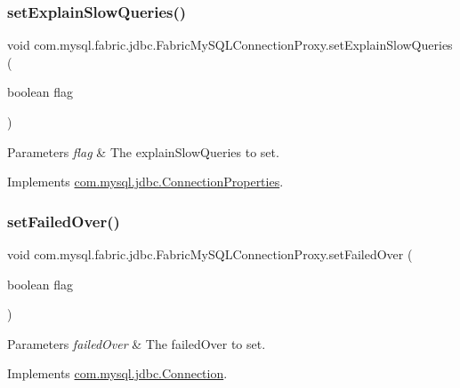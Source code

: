 \subsubsection{\texorpdfstring{set\+Explain\+Slow\+Queries()}{setExplainSlowQueries()}}
{\footnotesize\ttfamily void com.\+mysql.\+fabric.\+jdbc.\+Fabric\+My\+S\+Q\+L\+Connection\+Proxy.\+set\+Explain\+Slow\+Queries (\begin{DoxyParamCaption}\item[{boolean}]{flag }\end{DoxyParamCaption})}


\begin{DoxyParams}{Parameters}
{\em flag} & The explain\+Slow\+Queries to set. \\
\hline
\end{DoxyParams}


Implements \mbox{\hyperlink{interfacecom_1_1mysql_1_1jdbc_1_1_connection_properties_a9857fb61eea34e28c3bbff76b6ac5ca9}{com.\+mysql.\+jdbc.\+Connection\+Properties}}.

\mbox{\label{classcom_1_1mysql_1_1fabric_1_1jdbc_1_1_fabric_my_s_q_l_connection_proxy_a610e872bd5d4acf8872f52a93a30a9b2}} 
\subsubsection{\texorpdfstring{set\+Failed\+Over()}{setFailedOver()}}
{\footnotesize\ttfamily void com.\+mysql.\+fabric.\+jdbc.\+Fabric\+My\+S\+Q\+L\+Connection\+Proxy.\+set\+Failed\+Over (\begin{DoxyParamCaption}\item[{boolean}]{flag }\end{DoxyParamCaption})}


\begin{DoxyParams}{Parameters}
{\em failed\+Over} & The failed\+Over to set. \\
\hline
\end{DoxyParams}


Implements \mbox{\hyperlink{interfacecom_1_1mysql_1_1jdbc_1_1_connection_af1a58f95720963635270b83f16d558b0}{com.\+mysql.\+jdbc.\+Connection}}.

